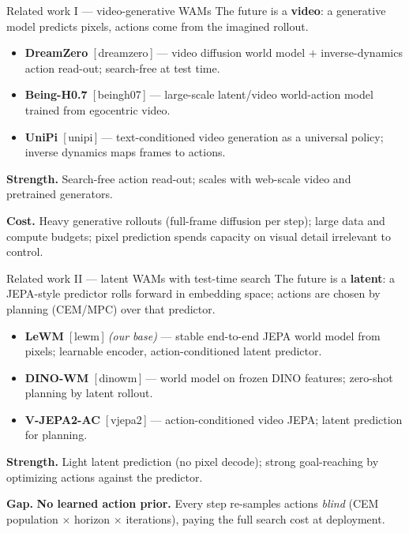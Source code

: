 \documentclass[aspectratio=169,10pt]{beamer}
\begin{document}
\begin{frame}{Related work I --- video-generative WAMs}
\footnotesize
The future is a \textbf{video}: a generative model predicts pixels, actions come from the imagined rollout.
\vspace{4pt}

\begin{itemize}\setlength\itemsep{4pt}
  \item \textbf{DreamZero}~[\,dreamzero\,] --- video diffusion world model $+$ inverse-dynamics action read-out; search-free at test time.
  \item \textbf{Being-H0.7}~[\,beingh07\,] --- large-scale latent/video world-action model trained from egocentric video.
  \item \textbf{UniPi}~[\,unipi\,] --- text-conditioned video generation as a universal policy; inverse dynamics maps frames to actions.
\end{itemize}

\vspace{6pt}
{\color{video}\textbf{Strength.}} Search-free action read-out; scales with web-scale video and pretrained generators.

\vspace{3pt}
{\color{black!75}\textbf{Cost.}} Heavy generative rollouts (full-frame diffusion per step); large data and compute budgets; pixel prediction spends capacity on visual detail irrelevant to control.
\end{frame}

\begin{frame}{Related work II --- latent WAMs with test-time search}
\footnotesize
The future is a \textbf{latent}: a JEPA-style predictor rolls forward in embedding space; actions are chosen by planning (CEM/MPC) over that predictor.
\vspace{4pt}

\begin{itemize}\setlength\itemsep{4pt}
  \item \textbf{LeWM}~[\,lewm\,] \emph{(our base)} --- stable end-to-end JEPA world model from pixels; learnable encoder, action-conditioned latent predictor.
  \item \textbf{DINO-WM}~[\,dinowm\,] --- world model on frozen DINO features; zero-shot planning by latent rollout.
  \item \textbf{V-JEPA2-AC}~[\,vjepa2\,] --- action-conditioned video JEPA; latent prediction for planning.
\end{itemize}

\vspace{6pt}
{\color{latent}\textbf{Strength.}} Light latent prediction (no pixel decode); strong goal-reaching by optimizing actions against the predictor.

\vspace{3pt}
{\color{black!75}\textbf{Gap.}} \textbf{No learned action prior.} Every step re-samples actions \emph{blind} (CEM population $\times$ horizon $\times$ iterations), paying the full search cost at deployment.
\end{frame}
\end{document}
